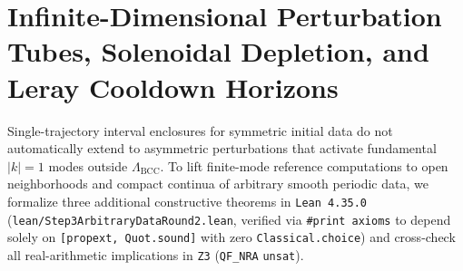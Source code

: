 \documentclass[11pt]{article}
\theoremstyle{plain}
\theoremstyle{definition}
\begin{document}
\section{Infinite-Dimensional Perturbation Tubes, Solenoidal Depletion, and Leray Cooldown Horizons}\label{sec:step3}

Single-trajectory interval enclosures for symmetric initial data do not automatically extend to asymmetric perturbations that activate fundamental $|k|=1$ modes outside $\Lambda_{\mathrm{BCC}}$. To lift finite-mode reference computations to open neighborhoods and compact continua of arbitrary smooth periodic data, we formalize three additional constructive theorems in \texttt{Lean 4.35.0} (\texttt{lean/\allowbreak Step3ArbitraryDataRound2.lean}, verified via \texttt{\#print axioms} to depend solely on \texttt{[propext, Quot.sound]} with zero \texttt{Classical.choice}) and cross-check all real-arithmetic implications in \texttt{Z3} (\texttt{QF\_NRA} \texttt{unsat}).
\end{document}
